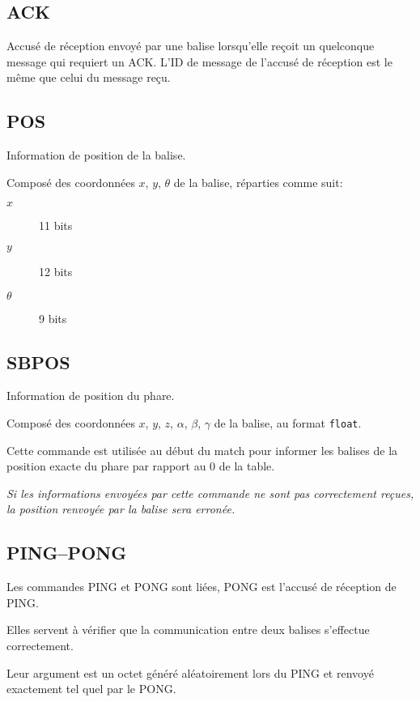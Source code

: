 \subsection{ACK}
	\label{subsec:ACK}

	Accusé de réception envoyé par une balise lorsqu'elle reçoit un quelconque message qui requiert un ACK.
	L'ID de message de l'accusé de réception est le même que celui du message reçu.

\subsection{POS}
	\label{subsec:POS}

	Information de position de la balise.

	Composé des coordonnées $x$, $y$, $\theta$ de la balise, réparties comme suit:

	\begin{description}
		\item[$x$] 11 bits
		\item[$y$] 12 bits
		\item[$\theta$] 9 bits
	\end{description}

\subsection{SBPOS}
	\label{subsec:SBPOS}

	Information de position du phare.

	Composé des coordonnées $x$, $y$, $z$, $\alpha$, $\beta$, $\gamma$ de la balise, au format \verb|float|.

	Cette commande est utilisée au début du match pour informer les balises de la position exacte du phare par rapport au $0$ de la table.

	\emph{Si les informations envoyées par cette commande ne sont pas correctement reçues, la position renvoyée par la balise sera erronée.}

\subsection{PING--PONG}
	\label{subsec:PING-PONG}

	Les commandes PING et PONG sont liées, PONG est l'accusé de réception de PING.

	Elles servent à vérifier que la communication entre deux balises s'effectue correctement.

	Leur argument est un octet généré aléatoirement lors du PING et renvoyé exactement tel quel par le PONG.

